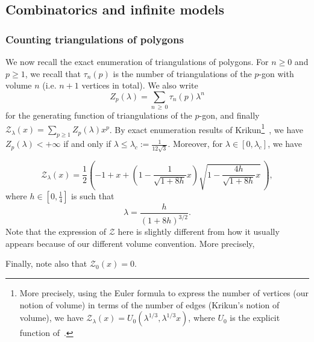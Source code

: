\documentclass[AHL,Unicode,longabstracts,published]{cedram}
\newcommand{\clZ}{\mathcal{Z}}
\begin{document}
\subsection{Combinatorics and infinite models}\label{subsec_combinatorics}

\subsubsection*{Counting triangulations of polygons}
We now recall the exact enumeration of triangulations of polygons. For $n \geq 0$ and $p \geq 1$, we recall that $\tau_n(p)$ is the number of triangulations of the $p$-gon with volume $n$ (i.e. $n+1$ vertices in total). We also write
\[
Z_p(\lambda)= \sum_{n\,\geq\,0} \tau_n(p) \lambda^n
\]
for the generating function of triangulations of the $p$-gon, and finally $\clZ_{\lambda}(x) = \sum_{p \geq 1} Z_p(\lambda) x^p$. By exact enumeration results of Krikun\footnote{More precisely, using the Euler formula to express the number of vertices (our notion of volume) in terms of the number of edges (Krikun's notion of volume), we have $\clZ_{\lambda}(x)=U_0(\lambda^{1/3}, \lambda^{1/3}x)$, where $U_0$ is the explicit function of~\cite[Section~2.2]{Kri07}.}~\cite{Kri07}, we have $Z_p(\lambda)<+\infty$ if and only if $\lambda \leq \lambda_c := \frac{1}{12\sqrt{3}}$. Moreover, for $\lambda \in [0,\lambda_c]$, we have

\begin{equation}\label{eqn_computation_Z}
\clZ_{\lambda}(x) = \frac{1}{2} \left(-1+x+\left(1-\frac{1}{\sqrt{1+8h}}x \right) \sqrt{1-\frac{4h}{\sqrt{1+8h}}x} \, \right),
\end{equation}
where $h \in [0,\tfrac{1}{4}]$ is such that
\begin{equation}\label{eqn_defn_h}
\lambda=\frac{h}{(1+8h)^{3/2}}.
\end{equation}
Note that the expression of $\clZ$ here is slightly different from how it usually appears because of our different volume convention. More precisely,



Finally, note also that $\clZ_0(x)=0$.
\end{document}
